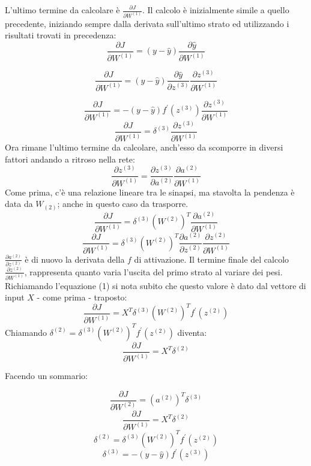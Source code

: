 L'ultimo termine da calcolare è $\frac{\partial J}{\partial W^{(1)}}$.
Il calcolo è inizialmente simile a quello precedente, iniziando sempre dalla derivata sull'ultimo strato ed utilizzando i risultati trovati in precedenza: 
$$
\frac{\partial J}{\partial W^{(1)}} = (y-\hat{y})
\frac{\partial \hat{y}}{\partial W^{(1)}}
$$

$$
\frac{\partial J}{\partial W^{(1)}} = (y-\hat{y})
\frac{\partial \hat{y}}{\partial z^{(3)}}
\frac{\partial z^{(3)}}{\partial W^{(1)}}
$$

$$
\frac{\partial J}{\partial W^{(1)}} = -(y-\hat{y}) f^\prime(z^{(3)}) \frac{\partial z^{(3)}}{\partial W^{(1)}}
$$
$$
\frac{\partial J}{\partial W^{(1)}} = \delta^{(3)} \frac{\partial z^{(3)}}{\partial W^{(1)}}
$$
Ora rimane l'ultimo termine da calcolare, anch'esso da scomporre in diversi fattori andando a ritroso nella rete:
$$
\frac{\partial z^{(3)}}{\partial W^{(1)}} = \frac{\partial z^{(3)}}{\partial a^{(2)}}\frac{\partial a^{(2)}}{\partial W^{(1)}}
$$
Come prima, c'è una relazione lineare tra le sinapsi, ma stavolta la pendenza è data da $W_{(2)}$; anche in questo caso da trasporre. 
$$
\frac{\partial J}{\partial W^{(1)}} = \delta^{(3)} 
(W^{(2)})^{T}
\frac{\partial a^{(2)}}{\partial W^{(1)}}
$$
$$
\frac{\partial J}{\partial W^{(1)}} = \delta^{(3)} 
(W^{(2)})^{T}
\frac{\partial a^{(2)}}{\partial z^{(2)}}
\frac{\partial z^{(2)}}{\partial W^{(1)}}
$$
$\frac{\partial a^{(2)}}{\partial z^{(2)}}$ è di nuovo la derivata della $f$ di attivazione. Il termine finale del calcolo $\frac{\partial z^{(2)}}{\partial W^{(1)}}$, rappresenta quanto varia l'uscita del primo strato al variare dei pesi. Richiamando l'equazione (1) si nota subito che questo valore è dato dal vettore di input $X$ - come prima - traposto: 
$$
\frac{\partial J}{\partial W^{(1)}} = 
X^{T}
\delta^{(3)} 
(W^{(2)})^{T}
f^\prime(z^{(2)})
$$
Chiamando $\delta^{(2)} = \delta^{(3)} (W^{(2)})^{T} f^\prime(z^{(2)})$ diventa: 
$$
\frac{\partial J}{\partial W^{(1)}} = 
X^{T}\delta^{(2)} \tag{7}
$$

Facendo un sommario: 

\begin{equation}
\boxed{\frac{\partial J}{\partial W^{(2)}} = 
(a^{(2)})^T\delta^{(3)}\tag{6}}
\end{equation}
\begin{equation}
\boxed{\frac{\partial J}{\partial W^{(1)}} = 
X^{T}\delta^{(2)} \tag{7}}
\end{equation}
\begin{equation}
\boxed{\delta^{(2)} = \delta^{(3)} (W^{(2)})^{T} f^\prime(z^{(2)}) \tag{8}}
\end{equation}
\begin{equation}
\boxed{\delta^{(3)} = -(y-\hat{y}) f^\prime(z^{(3)})  \tag{9}} \end{equation}

